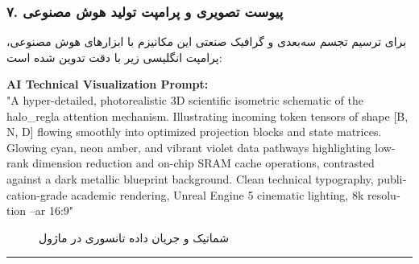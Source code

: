 \subsubsection*{۷. پیوست تصویری و پرامپت تولید هوش مصنوعی}
برای ترسیم تجسم سه‌بعدی و گرافیک صنعتی این مکانیزم با ابزارهای هوش مصنوعی، پرامپت انگلیسی زیر با دقت تدوین شده است:

\vspace{0.2cm}
\begin{latin}
\footnotesize
\textbf{AI Technical Visualization Prompt:}\\
"A hyper-detailed, photorealistic 3D scientific isometric schematic of the halo\_regla attention mechanism. Illustrating incoming token tensors of shape [B, N, D] flowing smoothly into optimized projection blocks and state matrices. Glowing cyan, neon amber, and vibrant violet data pathways highlighting low-rank dimension reduction and on-chip SRAM cache operations, contrasted against a dark metallic blueprint background. Clean technical typography, publication-grade academic rendering, Unreal Engine 5 cinematic lighting, 8k resolution --ar 16:9"
\end{latin}

\begin{figure}[H]
    \centering
    \caption{شماتیک و جریان داده تانسوری در ماژول }
    \label{fig:halo_regla}
\end{figure}

\vspace{0.5cm}
\hrule
\vspace{0.5cm}
